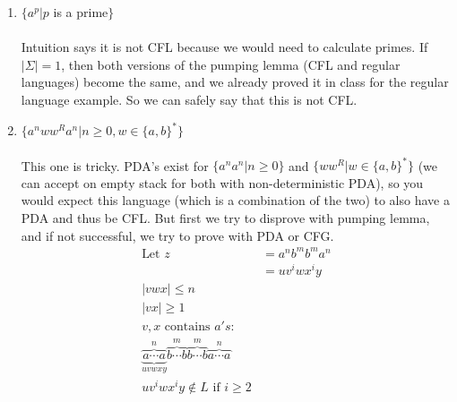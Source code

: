 \documentclass[10pt,a4paper,final]{article}
\begin{document}
\begin{enumerate}
\begin{enumerate}
  \item %
  $\{a^p|p$ is a prime$\}$ \\
  \\
  Intuition says it is not CFL because we would need to calculate primes.
  If $|\Sigma| = 1$, then both versions of the pumping lemma (CFL and regular languages)
  become the same, and we already proved it in class for the regular language example.
  So we can safely say that this is not CFL.
  
  \item %
  $\{a^n ww^R a^n | n \geq 0, w \in \{a,b\}^*\}$ \\
  \\
  This one is tricky. PDA's exist for $\{a^n a^n | n \geq 0\}$ and $\{ww^R | w \in \{a,b\}^*\}$
  (we can accept on empty stack for both with non-deterministic PDA), so you would expect this
  language (which is a combination of the two) to also have a PDA and thus be CFL. But first
  we try to disprove with pumping lemma, and if not successful, we try to prove with PDA or CFG.
  \begin{align*}
    \mbox{Let } z &= a^n b^m b^m a^n \\
    &= u v^i w x^i y \\
    |vwx| \leq n \\
    |vx| \geq 1 \\
    v,x \mbox{ contains } a's: \\
    \overbrace{\underbrace{a \cdots a}_{uvwxy}}^{n} \overbrace{b \cdots b}^{m} \overbrace{b \cdots b}^{m} \overbrace{a \cdots a}^{n} \\
    u v^i w x^i y \notin L \mbox{ if } i \geq 2
  \end{align*}
\end{enumerate}

\end{enumerate}
\end{document}
